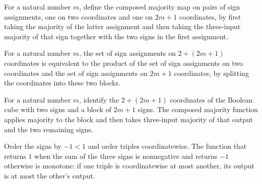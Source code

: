 \begin{definition}
\label{FABL.composedMajoritySplit}
\leanok
{}
For a natural number $m$, define the composed majority map on pairs of sign assignments,
one on two coordinates and one on $2m+1$ coordinates, by first taking the majority of
the latter assignment and then taking the three-input majority of that sign together
with the two signs in the first assignment.
\end{definition}

\begin{definition}
\label{FABL.composedMajoritySplitEquiv}
\leanok
{}
For a natural number $m$, the set of sign assignments on $2+(2m+1)$ coordinates is
equivalent to the product of the set of sign assignments on two coordinates and the set
of sign assignments on $2m+1$ coordinates, by splitting the coordinates into these two
blocks.
\end{definition}

\begin{definition}
\label{FABL.composedMajority}
\leanok
{}
For a natural number $m$, identify the $2+(2m+1)$ coordinates of the Boolean cube with
two signs and a block of $2m+1$ signs. The composed majority function applies majority
to the block and then takes three-input majority of that output and the two remaining
signs.
\end{definition}

\begin{theorem}
\label{FABL.majorityThreeValue_monotone}
\leanok
{}
Order the signs by $-1<1$ and order triples coordinatewise. The function that returns
$1$ when the sum of the three signs is nonnegative and returns $-1$ otherwise is
monotone: if one triple is coordinatewise at most another, its output is at most the
other's output.
\end{theorem}


